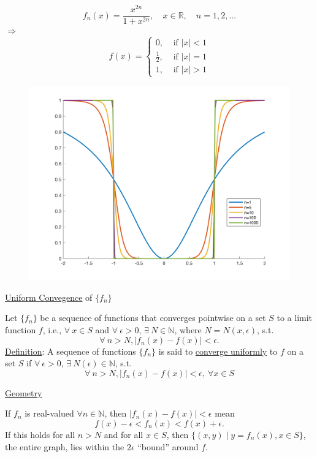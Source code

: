 \documentclass[twoside]{article}
\newcommand\imp{$\Longrightarrow$}
\begin{document}
\begin{example}
    \[
    f_{n}(x) = \frac{x^{2n}}{1 + x^{2n}}, \quad x \in \mathbb{R}, \quad n = 1,2,...
    \]
    \imp
    \[
    f(x) = \begin{cases}
        0,           &\text{ if }|x|<1\\
        \frac{1}{2}, &\text{ if }|x|=1\\
        1,           &\text{ if }|x|>1
    \end{cases}
    \]
    \begin{figure}[htbp] 
    \centering
    \includegraphics[width=.8\textwidth]{figure/fig1.png}
    \end{figure}
\end{example}

\underline{Uniform Convegence} of $\{f_n\}$

Let $\{f_n\}$ be a sequence of functions that converges pointwise on a set $S$ to a limit function $f$, i.e., $\forall ~ x \in S$ and $\forall ~ \epsilon > 0$, $\exists ~ N \in \mathbb{N}$, where $N = N(x, \epsilon)$, s.t. 
\[
    \forall ~ n > N, |f_n(x) - f(x)| < \epsilon.
\]
\underline{Definition}: A sequence of functions $\{f_n\}$ is said to \underline{converge uniformly} to $f$ on a set $S$ if $\forall ~ \epsilon > 0$, $\exists ~ N(\epsilon) \in \mathbb{N}$, s.t. 
\[
    \forall ~ n > N, |f_n(x) - f(x)| < \epsilon, ~ \forall x \in S
\]

\underline{Geometry}

If $f_n$ is real-valued $\forall n \in \mathbb{N}$, then $| f_n(x) - f(x) | < \epsilon $ mean  
$$ f(x) - \epsilon  < f_n(x)  < f(x)  + \epsilon .$$
If this holds for all $n > N$ and for all $x \in S$, then $\{(x,y) \mid y = f_n(x), x \in S \}$, the entire graph, lies within the $2 \epsilon $ ``bound'' around $f$.
\end{document}
